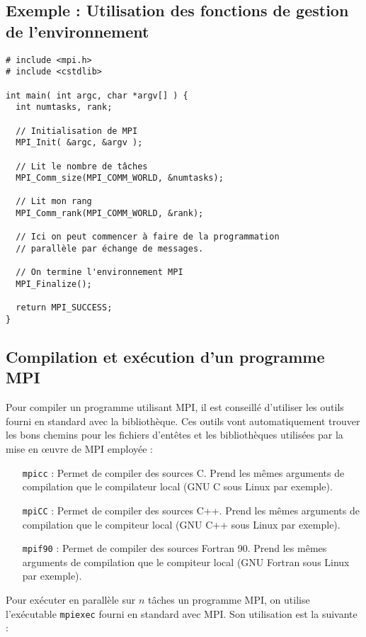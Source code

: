 \documentclass[11pt,a4paper]{article}
\begin{document}
\subsection{Exemple : Utilisation des fonctions de gestion de l'environnement}

\begin{lstlisting}[style=customcpp]
# include <mpi.h>
# include <cstdlib>

int main( int argc, char *argv[] ) {
  int numtasks, rank;

  // Initialisation de MPI
  MPI_Init( &argc, &argv );

  // Lit le nombre de tâches
  MPI_Comm_size(MPI_COMM_WORLD, &numtasks);

  // Lit mon rang
  MPI_Comm_rank(MPI_COMM_WORLD, &rank);

  // Ici on peut commencer à faire de la programmation
  // parallèle par échange de messages.

  // On termine l'environnement MPI
  MPI_Finalize();

  return MPI_SUCCESS;	
}
\end{lstlisting}

\subsection{Compilation et exécution d'un programme MPI}

Pour compiler un programme utilisant MPI, il est conseillé d'utiliser les outils fourni en standard avec la
bibliothèque. Ces outils vont automatiquement trouver les bons chemins pour les fichiers d'entêtes et les bibliothèques
utilisées par la mise en {\oe}uvre de MPI employée :
\begin{itemize}
\item[\texttt{mpicc}] : Permet de compiler des sources C. Prend les mêmes arguments de compilation que le compilateur local (GNU C sous Linux par exemple).
\item[\texttt{mpiCC}] : Permet de compiler des sources C++. Prend les mêmes arguments de compilation que le compiteur local (GNU C++ sous Linux par exemple).
\item[\texttt{mpif90}] : Permet de compiler des sources Fortran 90. Prend les mêmes arguments de compilation que le compiteur local (GNU Fortran sous Linux par exemple).
\end{itemize}

Pour exécuter en parallèle sur $n$ tâches un programme MPI, on utilise l'exécutable \texttt{mpiexec} fourni en
standard avec MPI. Son utilisation est la suivante :
\end{document}
